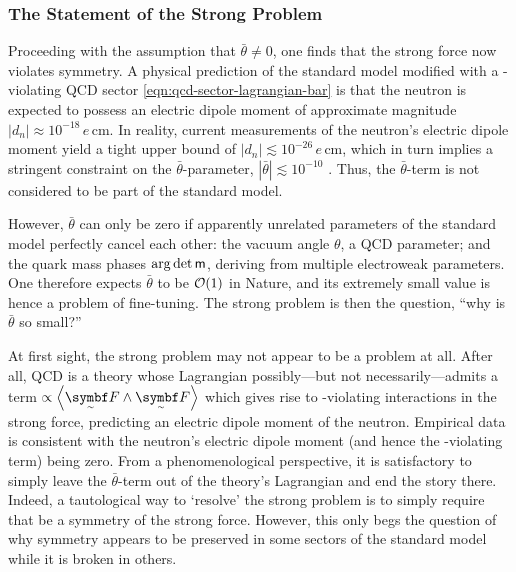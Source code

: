 \subsubsection{The Statement of the Strong \CP Problem}


Proceeding with the assumption that $\bar θ \ne 0$, one finds that the strong force now violates \CP symmetry.
A physical prediction of the standard model modified with a \CP-violating QCD sector \eqref{eqn:qcd-sector-lagrangian-bar} is that the neutron is expected to possess an electric dipole moment of approximate magnitude $|d_n| \approx 10^{-18} \,e\,\mathrm{cm}$.
In reality, current measurements \cite{electric_dipole_neutron_2020,lectures-on-scpp} of the neutron's electric dipole moment yield a tight upper bound of $|d_n| \lesssim 10^{-26} \,e\,\mathrm{cm}$, which in turn implies a stringent constraint on the $\bar θ$-parameter, $|\bar θ| \lesssim 10^{-10}$ \cite{ParticleDataGroup-review-2020}.
Thus, the $\bar θ$-term is not considered to be part of the standard model.

However, $\bar θ$ can only be zero if apparently unrelated parameters of the standard model perfectly cancel each other: the vacuum angle $θ$, a QCD parameter; and the quark mass phases $\arg\det\mat m$, deriving from multiple electroweak parameters.
One therefore expects $\bar θ$ to be $\cal O(1)$ in Nature, and its extremely small value is hence a problem of fine-tuning.
The strong \CP problem is then the question, ``why is $\bar θ$ so small?''




At first sight, the strong \CP problem may not appear to be a problem at all.
After all, QCD is a theory whose Lagrangian possibly---but not necessarily---admits a term $\propto \angbr{\tsbm F \wedge \tsbm F}$ which gives rise to \CP-violating interactions in the strong force, predicting an electric dipole moment of the neutron.
Empirical data is consistent with the neutron's electric dipole moment (and hence the \CP-violating term) being zero.
From a phenomenological perspective, it is satisfactory to simply leave the $\bar θ$-term out of the theory's Lagrangian and end the story there.
Indeed, a tautological way to `resolve' the strong \CP problem is to simply require that \CP be a symmetry of the strong force.
However, this only begs the question of why \CP symmetry appears to be preserved in some sectors of the standard model while it is broken in others.

